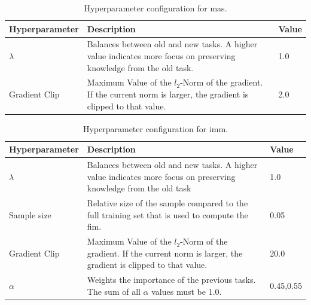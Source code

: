 \begin{table}[!htb]
    \begin{tabularx}{\textwidth}{| l | X | l |} 
        \hline
        Hyperparameter & Description & Value \\ 
        \hline 
        \hline
        $\lambda$ & Balances between old and new tasks. A higher value indicates more focus
        on preserving knowledge \newline from the old task. & 1.0  \\ 
        \hline
        Gradient Clip & Maximum Value of the $l_2$-Norm of the gradient. If the current norm is larger, the
        gradient is clipped to that value. & 2.0 \\ 
        \hline
    \end{tabularx}
    \caption{Hyperparameter configuration for \gls{mas}.}
    \label{fig:MASparams}
\end{table}

\begin{table}[!htb]
    \begin{tabularx}{\textwidth}{| l | X | l |} 
        \hline
        Hyperparameter & Description & Value \\ 
        \hline 
        \hline
        $\lambda$ & Balances between old and new tasks. A higher value indicates more focus
        on preserving knowledge from the old task & 1.0  \\ 
        \hline
        Sample size & Relative size of the sample compared to the full training set that is used to 
        compute the \gls{fim}. & 0.05  \\ 
        \hline
        Gradient Clip & Maximum Value of the $l_2$-Norm of the gradient. If the current norm is larger, the
        gradient is clipped to that value. & 20.0 \\ 
        \hline
        $\alpha$ & Weights the importance of the previous tasks. The sum of all $\alpha$ values must be 1.0. & 0.45,0.55 \\
        \hline
    \end{tabularx}
    \caption{Hyperparameter configuration for \gls{imm}.}
    \label{fig:IMMparams}
\end{table}

